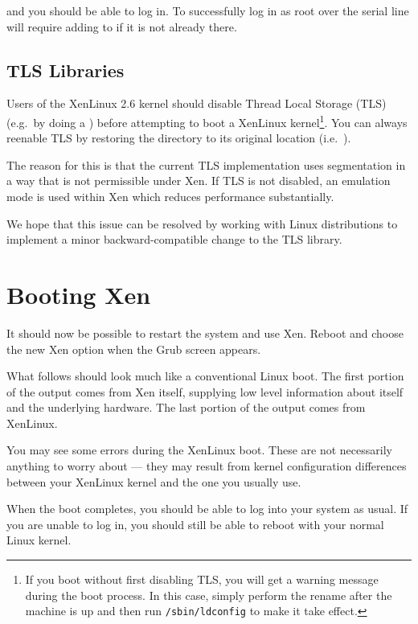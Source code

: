 and you should be able to log in. To successfully log in as root over
the serial line will require adding  to
 if it is not already there.

\subsection{TLS Libraries}

Users of the XenLinux 2.6 kernel should disable Thread Local Storage
(TLS) (e.g.\ by doing a ) before
attempting to boot a XenLinux kernel\footnote{If you boot without
  first disabling TLS, you will get a warning message during the boot
  process. In this case, simply perform the rename after the machine
  is up and then run \texttt{/sbin/ldconfig} to make it take effect.}.
You can always reenable TLS by restoring the directory to its original
location (i.e.\ ).

The reason for this is that the current TLS implementation uses
segmentation in a way that is not permissible under Xen.  If TLS is
not disabled, an emulation mode is used within Xen which reduces
performance substantially.

We hope that this issue can be resolved by working with Linux
distributions to implement a minor backward-compatible change
to the TLS library.


\section{Booting Xen}

It should now be possible to restart the system and use Xen.  Reboot
and choose the new Xen option when the Grub screen appears.

What follows should look much like a conventional Linux boot.  The
first portion of the output comes from Xen itself, supplying low level
information about itself and the underlying hardware.  The last
portion of the output comes from XenLinux.

You may see some errors during the XenLinux boot.  These are not
necessarily anything to worry about --- they may result from kernel
configuration differences between your XenLinux kernel and the one you
usually use.

When the boot completes, you should be able to log into your system as
usual.  If you are unable to log in, you should still be able to
reboot with your normal Linux kernel.

